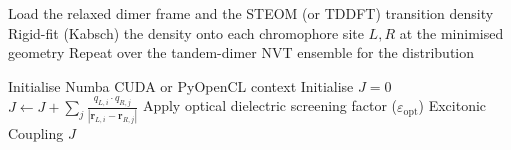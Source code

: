 \documentclass[journal=jpcbfk, manuscript=article, layout=twocolumn, doi=true]{achemso}
\begin{document}
\begin{algorithm*}[ht]
\begin{algorithmic}[1]
\vspace{0.2cm}
    \State Load the relaxed dimer frame and the STEOM (or TDDFT) transition density
    \State Rigid-fit (Kabsch) the density onto each chromophore site $L,R$
    \State {} at the minimised geometry
    \State Repeat over the tandem-dimer NVT ensemble for the distribution
\EndProcedure

\vspace{0.2cm}
    \State Initialise Numba CUDA or PyOpenCL context
    \State Initialise $J = 0$
        \State $J \gets J + \sum_j \frac{q_{L,i} \cdot q_{R,j}}{|\mathbf{r}_{L,i} - \mathbf{r}_{R,j}|}$
    \EndFor
    \State Apply optical dielectric screening factor ($\varepsilon_{\mathrm{opt}}$)
    \State \Return Excitonic Coupling $J$
\EndProcedure
\end{algorithmic}
\end{algorithm*}
\end{document}
